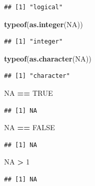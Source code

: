 \documentclass[]{book}
\newenvironment{Shaded}{\begin{snugshade}}{\end{snugshade}}
\newcommand{\KeywordTok}[1]{\textcolor[rgb]{0.13,0.29,0.53}{\textbf{#1}}}
\newcommand{\DecValTok}[1]{\textcolor[rgb]{0.00,0.00,0.81}{#1}}
\newcommand{\StringTok}[1]{\textcolor[rgb]{0.31,0.60,0.02}{#1}}
\newcommand{\OtherTok}[1]{\textcolor[rgb]{0.56,0.35,0.01}{#1}}
\newcommand{\OperatorTok}[1]{\textcolor[rgb]{0.81,0.36,0.00}{\textbf{#1}}}
\newcommand{\NormalTok}[1]{#1}
\begin{document}
\begin{verbatim}
## [1] "logical"
\end{verbatim}

\begin{Shaded}
\begin{Highlighting}[]
\KeywordTok{typeof}\NormalTok{(}\KeywordTok{as.integer}\NormalTok{(}\OtherTok{NA}\NormalTok{))}
\end{Highlighting}
\end{Shaded}

\begin{verbatim}
## [1] "integer"
\end{verbatim}

\begin{Shaded}
\begin{Highlighting}[]
\KeywordTok{typeof}\NormalTok{(}\KeywordTok{as.character}\NormalTok{(}\OtherTok{NA}\NormalTok{))}
\end{Highlighting}
\end{Shaded}

\begin{verbatim}
## [1] "character"
\end{verbatim}

\begin{Shaded}
\begin{Highlighting}[]
\OtherTok{NA} \OperatorTok{==}\StringTok{ }\OtherTok{TRUE}
\end{Highlighting}
\end{Shaded}

\begin{verbatim}
## [1] NA
\end{verbatim}

\begin{Shaded}
\begin{Highlighting}[]
\OtherTok{NA} \OperatorTok{==}\StringTok{ }\OtherTok{FALSE}
\end{Highlighting}
\end{Shaded}

\begin{verbatim}
## [1] NA
\end{verbatim}

\begin{Shaded}
\begin{Highlighting}[]
\OtherTok{NA} \OperatorTok{>}\StringTok{ }\DecValTok{1}
\end{Highlighting}
\end{Shaded}

\begin{verbatim}
## [1] NA
\end{verbatim}
\end{document}
